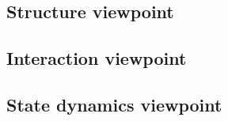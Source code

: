 \subsection{Structure viewpoint}

% 
% 
% 
% 
% 
% 
% 
% 
% 
% 
\subsection{Interaction viewpoint}

% 
% 
% 
% 
% 
% 

\subsection{State dynamics viewpoint}

% 
% 
% 
% 
% 
% 
% 
% 
% 

